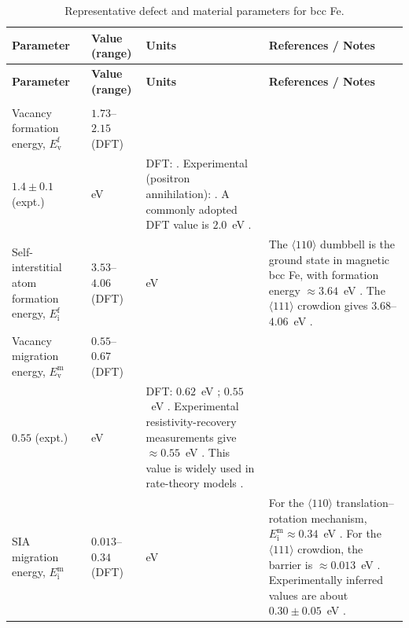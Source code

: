 \documentclass[pdflatex,sn-basic]{sn-jnl} %
\begin{document}
\begin{longtable}{>{\raggedright\arraybackslash}p{3.6cm}
                  >{\raggedright\arraybackslash}p{2.7cm}
                  >{\raggedright\arraybackslash}p{1.8cm}
                  >{\raggedright\arraybackslash}p{7.0cm}}
\caption{Representative defect and material parameters for bcc Fe.}
\label{tab:fe_parameters}\\
\toprule
\textbf{Parameter} & \textbf{Value (range)} & \textbf{Units} & \textbf{References / Notes} \\
\midrule
\endfirsthead

\toprule
\textbf{Parameter} & \textbf{Value (range)} & \textbf{Units} & \textbf{References / Notes} \\
\midrule
\endhead

\midrule
\multicolumn{4}{r}{\textit{Continued on next page}}\\
\endfoot

\bottomrule
\endlastfoot

Vacancy formation energy, $E_{\mathrm{v}}^{\mathrm{f}}$ &
$1.73$--$2.15$ (DFT)\\
$1.4 \pm 0.1$ (expt.) &
eV &
DFT: \cite{Fu2004,Domain2001,Muzyk2011}. Experimental (positron annihilation): \cite{Kim1978,Vehanen1982}. A commonly adopted DFT value is $2.0$~eV \cite{Bonny2011,Was2017}. \\[3pt]

Self-interstitial atom formation energy, $E_{\mathrm{i}}^{\mathrm{f}}$ &
$3.53$--$4.06$ (DFT) &
eV &
The $\langle110\rangle$ dumbbell is the ground state in magnetic bcc Fe, with formation energy $\approx 3.64$~eV \cite{Fu2004,Domain2001,Nguyen2006}. The $\langle111\rangle$ crowdion gives $3.68$--$4.06$~eV \cite{Willaime2005}. \\[3pt]

Vacancy migration energy, $E_{\mathrm{v}}^{\mathrm{m}}$ &
$0.55$--$0.67$ (DFT)\\
$0.55$ (expt.) &
eV &
DFT: $0.62$~eV \cite{Fu2004}; $0.55$~eV \cite{Domain2001}. Experimental resistivity-recovery measurements give $\approx 0.55$~eV \cite{Vehanen1982,Seeger1998}. This value is widely used in rate-theory models \cite{Was2017}. \\[3pt]

SIA migration energy, $E_{\mathrm{i}}^{\mathrm{m}}$ &
$0.013$--$0.34$ (DFT) &
eV &
For the $\langle110\rangle$ translation--rotation mechanism, $E_{\mathrm{i}}^{\mathrm{m}} \approx 0.34$~eV \cite{Fu2004,Domain2001}. For the $\langle111\rangle$ crowdion, the barrier is $\approx 0.013$~eV \cite{Nguyen2006}. Experimentally inferred values are about $0.30 \pm 0.05$~eV \cite{Seeger1998,Was2017}. \\[3pt]


\end{longtable}
\end{document}
